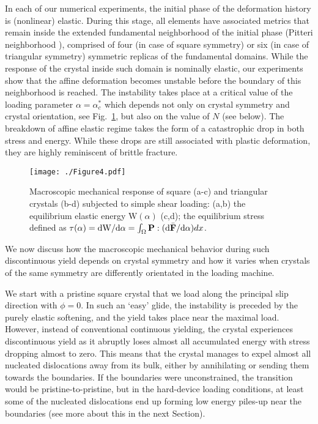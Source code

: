 \documentclass[CRPHYS,Unicode,manuscript]{cedram}
\begin{document}
In each of our numerical experiments, the initial phase of the deformation history is (nonlinear) elastic. During this stage, all elements have associated metrics that remain inside the extended fundamental neighborhood of the initial phase   (Pitteri neighborhood \cite{pitteri2002continuum}), comprised of four (in case of square symmetry) or six (in case of triangular symmetry) symmetric replicas of the fundamental domains. While the response of the crystal inside such domain is nominally elastic, our experiments show that the affine deformation becomes unstable before the boundary of this neighborhood is reached. The instability takes place at a critical value of the loading parameter $\alpha=\alpha^*_c$ which depends not only on crystal symmetry and crystal orientation, see Fig.~\ref{fig:energydrops}, but also on the value of $N$ (see below). The breakdown of affine elastic regime takes the form of a catastrophic drop in both stress and energy. While these drops are still associated with plastic deformation,  they are highly reminiscent of brittle fracture.

\begin{figure}[h!]
\centering
\texttt{[image: ./Figure4.pdf]}
\caption{\scriptsize {Macroscopic mechanical response of square (a-c) and triangular  crystals (b-d) subjected to simple shear loading: (a,b) the  equilibrium elastic energy $\mathrm{W}(\alpha)$ (c,d);   the equilibrium stress defined as $\tau(\alpha)=\text{d}\mathrm{W}/\text{d}\alpha=\int_{\Omega}{\bf P}:(\text{d}\bar {\bf F}/\text{d}\alpha)dx$.
  }
 \label{fig:energydrops}}
\end{figure}

We now discuss how the macroscopic mechanical behavior during such discontinuous yield depends on crystal symmetry and how it varies when crystals of the same symmetry are differently orientated in the loading machine.

We start with a pristine square crystal that we load along the principal slip direction with $\phi=0$. In such an `easy' glide, the instability is preceded by the purely elastic softening, and the yield takes place near the maximal load. However, instead of conventional continuous yielding, the crystal experiences discontinuous yield as it abruptly loses almost all accumulated energy with stress dropping almost to zero. This means that the crystal manages to expel almost all nucleated dislocations away from its bulk, either by annihilating or sending them towards the boundaries. If the boundaries were unconstrained, the transition would be pristine-to-pristine, but in the hard-device loading conditions, at least some of the nucleated dislocations end up forming low energy piles-up near the boundaries (see more about this in the next Section). 
\end{document}
